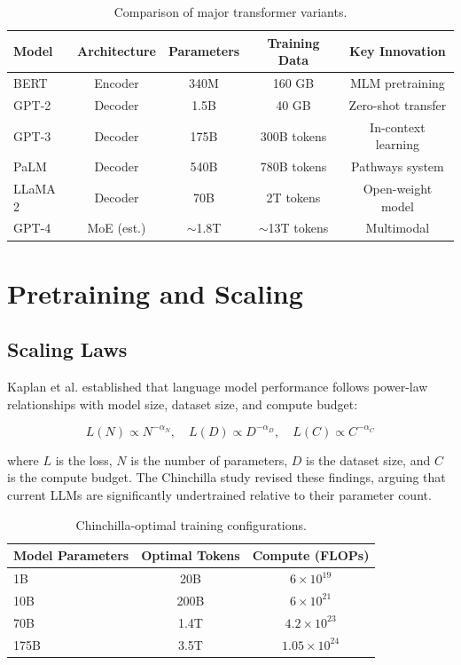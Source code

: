 \documentclass[
    language=english,
    doctype=review-article,
    institution=none,
]{../../omnilatex}
\begin{document}
\begin{table}[htbp]
    \centering
    \caption{Comparison of major transformer variants.}
    \label{tab:variants}
    \begin{tabular}{@{}lcccc@{}}
        \toprule
        Model & Architecture & Parameters & Training Data & Key Innovation \\
        \midrule
        BERT & Encoder & 340M & 160 GB & MLM pretraining \\
        GPT-2 & Decoder & 1.5B & 40 GB & Zero-shot transfer \\
        GPT-3 & Decoder & 175B & 300B tokens & In-context learning \\
        PaLM & Decoder & 540B & 780B tokens & Pathways system \\
        LLaMA 2 & Decoder & 70B & 2T tokens & Open-weight model \\
        GPT-4 & MoE (est.) & $\sim$1.8T & $\sim$13T tokens & Multimodal \\
        \bottomrule
    \end{tabular}
\end{table}

\section{Pretraining and Scaling}
\label{sec:pretraining}

\subsection{Scaling Laws}

Kaplan et al. \cite{kaplan2020scaling} established that language model
performance follows power-law relationships with model size, dataset size,
and compute budget:

\begin{equation}
    L(N) \propto N^{-\alpha_N}, \quad L(D) \propto D^{-\alpha_D}, \quad L(C) \propto C^{-\alpha_C}
    \label{eq:scaling}
\end{equation}

where $L$ is the loss, $N$ is the number of parameters, $D$ is the dataset
size, and $C$ is the compute budget. The Chinchilla study \cite{hoffmann2022chinchilla}
revised these findings, arguing that current LLMs are significantly
undertrained relative to their parameter count.

\begin{table}[htbp]
    \centering
    \caption{Chinchilla-optimal training configurations.}
    \label{tab:chinchilla}
    \begin{tabular}{@{}lcc@{}}
        \toprule
        Model Parameters & Optimal Tokens & Compute (FLOPs) \\
        \midrule
        1B  & 20B   & $6 \times 10^{19}$ \\
        10B & 200B  & $6 \times 10^{21}$ \\
        70B & 1.4T  & $4.2 \times 10^{23}$ \\
        175B & 3.5T & $1.05 \times 10^{24}$ \\
        \bottomrule
    \end{tabular}
\end{table}
\end{document}
